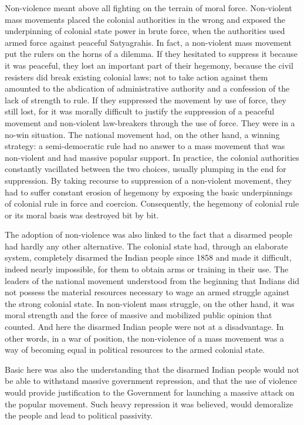 Non-violence meant above all fighting on the terrain of moral force. Non-violent mass movements placed the colonial authorities in the wrong and exposed the underpinning of colonial state power in brute force, when the authorities used armed force against peaceful Satyagrahis. In fact, a non-violent mass movement put the rulers on the horns of a dilemma. If they hesitated to suppress it because it was peaceful, they lost an important part of their hegemony, because the civil resisters did break existing colonial laws; not to take action against them amounted to the abdication of administrative authority and a confession of the lack of strength to rule. If they suppressed the movement by use of force, they still lost, for it was morally difficult to justify the suppression of a peaceful movement and non-violent law-breakers through the use of force. They were in a no-win situation. The national movement had, on the other hand, a winning strategy: a semi-democratic rule had no answer to a mass movement that was non-violent and had massive popular support. In practice, the colonial authorities constantly vacillated between the two choices, usually plumping in the end for suppression. By taking recourse to suppression of a non-violent movement, they had to suffer constant erosion of hegemony by exposing the basic underpinnings of colonial rule in force and coercion. Consequently, the hegemony of colonial rule or its moral basis was destroyed bit by bit. 

The adoption of non-violence was also linked to the fact that a disarmed people had hardly any other alternative. The colonial state had, through an elaborate system, completely disarmed the Indian people since 1858 and made it difficult, indeed nearly impossible, for them to obtain arms or training in their use. The leaders of the national movement understood from the beginning that Indians did not possess the material resources necessary to wage an armed struggle against the strong colonial state. In non-violent mass struggle, on the other hand, it was moral strength and the force of massive and mobilized public opinion that counted. And here the disarmed Indian people were not at a disadvantage. In other words, in a war of position, the non-violence of a mass movement was a way of becoming equal in political resources to the armed colonial state. 

Basic here was also the understanding that the disarmed Indian people would not be able to withstand massive government repression, and that the use of violence would provide justification to the Government for launching a massive attack on the popular movement. Such heavy repression it was believed, would demoralize the people and lead to political passivity. 

